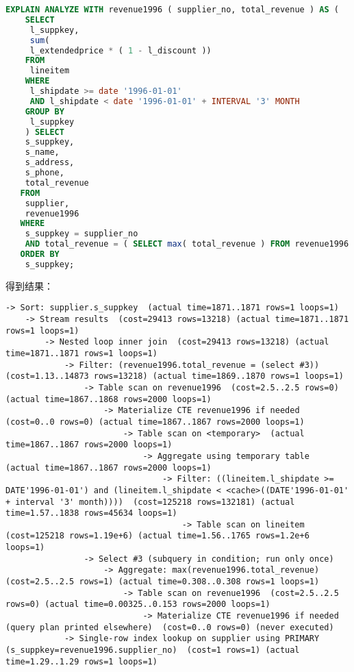 \documentclass{article}
\begin{document}
\begin{lstlisting}[language=sql]
EXPLAIN ANALYZE WITH revenue1996 ( supplier_no, total_revenue ) AS (
    SELECT
     l_suppkey,
     sum(
     l_extendedprice * ( 1 - l_discount )) 
    FROM
     lineitem 
    WHERE
     l_shipdate >= date '1996-01-01' 
     AND l_shipdate < date '1996-01-01' + INTERVAL '3' MONTH 
    GROUP BY
     l_suppkey 
    ) SELECT
    s_suppkey,
    s_name,
    s_address,
    s_phone,
    total_revenue 
   FROM
    supplier,
    revenue1996 
   WHERE
    s_suppkey = supplier_no 
    AND total_revenue = ( SELECT max( total_revenue ) FROM revenue1996 ) 
   ORDER BY
    s_suppkey;
\end{lstlisting}

得到结果：

\begin{lstlisting}
-> Sort: supplier.s_suppkey  (actual time=1871..1871 rows=1 loops=1)
    -> Stream results  (cost=29413 rows=13218) (actual time=1871..1871 rows=1 loops=1)
        -> Nested loop inner join  (cost=29413 rows=13218) (actual time=1871..1871 rows=1 loops=1)
            -> Filter: (revenue1996.total_revenue = (select #3))  (cost=1.13..14873 rows=13218) (actual time=1869..1870 rows=1 loops=1)
                -> Table scan on revenue1996  (cost=2.5..2.5 rows=0) (actual time=1867..1868 rows=2000 loops=1)
                    -> Materialize CTE revenue1996 if needed  (cost=0..0 rows=0) (actual time=1867..1867 rows=2000 loops=1)
                        -> Table scan on <temporary>  (actual time=1867..1867 rows=2000 loops=1)
                            -> Aggregate using temporary table  (actual time=1867..1867 rows=2000 loops=1)
                                -> Filter: ((lineitem.l_shipdate >= DATE'1996-01-01') and (lineitem.l_shipdate < <cache>((DATE'1996-01-01' + interval '3' month))))  (cost=125218 rows=132181) (actual time=1.57..1838 rows=45634 loops=1)
                                    -> Table scan on lineitem  (cost=125218 rows=1.19e+6) (actual time=1.56..1765 rows=1.2e+6 loops=1)
                -> Select #3 (subquery in condition; run only once)
                    -> Aggregate: max(revenue1996.total_revenue)  (cost=2.5..2.5 rows=1) (actual time=0.308..0.308 rows=1 loops=1)
                        -> Table scan on revenue1996  (cost=2.5..2.5 rows=0) (actual time=0.00325..0.153 rows=2000 loops=1)
                            -> Materialize CTE revenue1996 if needed (query plan printed elsewhere)  (cost=0..0 rows=0) (never executed)
            -> Single-row index lookup on supplier using PRIMARY (s_suppkey=revenue1996.supplier_no)  (cost=1 rows=1) (actual time=1.29..1.29 rows=1 loops=1)
\end{lstlisting}
\end{document}
